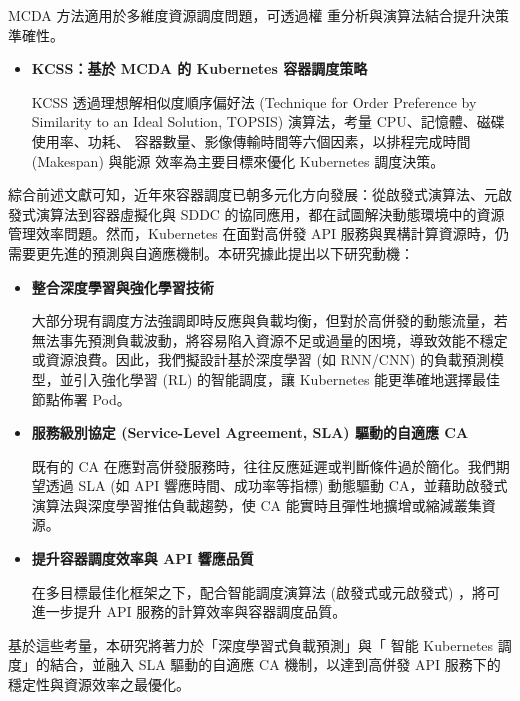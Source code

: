 \documentclass[12pt,a4paper]{article}
\begin{document}
\begin{enumerate}[label={(\zhdig*)}, leftmargin=2\parindent, listparindent=\parindent]
\begin{enumerate}[label={(\arabic*)}, leftmargin=\parindent, listparindent=\parindent]
\begin{enumerate}[label={(\zhdig*)}, leftmargin=\parindent, listparindent=\parindent]
MCDA 方法適用於多維度資源調度問題，可透過權
重分析與演算法結合提升決策準確性。
\begin{itemize}[leftmargin=\parindent, listparindent=\parindent]
    \item \textbf{\cite{17} KCSS：基於 MCDA 的 Kubernetes 容器調度策略}

    KCSS 透過理想解相似度順序偏好法 (Technique for Order Preference by Similarity to an Ideal Solution, TOPSIS) 演算法，考量 CPU、記憶體、磁碟使用率、功耗、
    容器數量、影像傳輸時間等六個因素，以排程完成時間 (Makespan) 與能源
    效率為主要目標來優化 Kubernetes 調度決策。

\end{itemize}

\end{enumerate}

綜合前述文獻可知，近年來容器調度已朝多元化方向發展：從啟發式演算法、元啟發式演算法到容器虛擬化與 SDDC 的協同應用，都在試圖解決動態環境中的資源管理效率問題。然而，Kubernetes 在面對高併發 API 服務與異構計算資源時，仍需要更先進的預測與自適應機制。本研究據此提出以下研究動機：
\begin{itemize}[leftmargin=\parindent, listparindent=\parindent]

	\item\textbf{整合深度學習與強化學習技術}

大部分現有調度方法強調即時反應與負載均衡，但對於高併發的動態流量，若無法事先預測負載波動，將容易陷入資源不足或過量的困境，導致效能不穩定或資源浪費。因此，我們擬設計基於深度學習 (如 RNN/CNN) 的負載預測模型，並引入強化學習 (RL) 的智能調度，讓 Kubernetes 能更準確地選擇最佳節點佈署 Pod。

    \item\textbf{服務級別協定 (Service-Level Agreement, SLA) 驅動的自適應 CA}

既有的 CA 在應對高併發服務時，往往反應延遲或判斷條件過於簡化。我們期望透過 SLA (如 API 響應時間、成功率等指標) 動態驅動 CA，並藉助啟發式演算法與深度學習推估負載趨勢，使 CA 能實時且彈性地擴增或縮減叢集資源。

    \item\textbf{提升容器調度效率與 API 響應品質}

在多目標最佳化框架之下，配合智能調度演算法 (啟發式或元啟發式) ，將可進一步提升 API 服務的計算效率與容器調度品質。

\end{itemize}

基於這些考量，本研究將著力於「深度學習式負載預測」與「 智能 Kubernetes 調度」的結合，並融入 SLA 驅動的自適應 CA 機制，以達到高併發 API 服務下的穩定性與資源效率之最優化。


\end{enumerate}
\end{enumerate}
\end{document}
